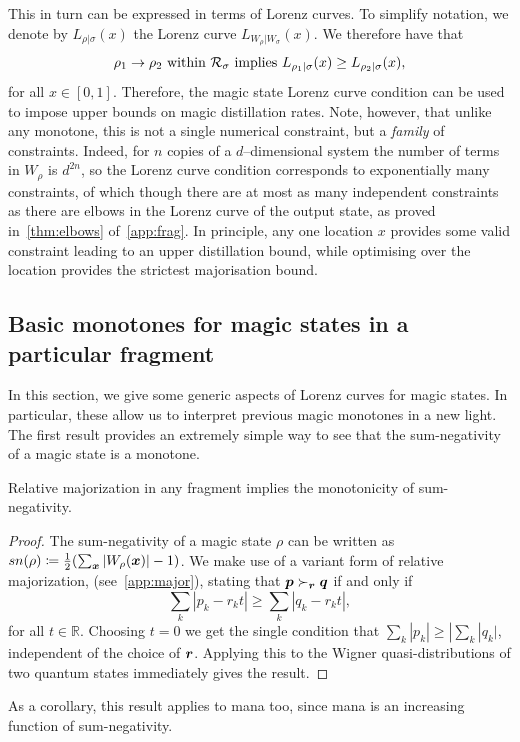 \documentclass[pra,
aps,
twocolumn,
superscriptaddress,
groupedaddress,
nofootinbib,
reprint
]{revtex4-1}
\begin{document}
This in turn can be expressed in terms of Lorenz curves. To simplify notation, we denote by $L_{\rho | \sigma}(x)$ the Lorenz curve $L_{W_{\rho} | W_{\sigma}} (x)$. We therefore have that
\begin{equation}
\rho_1 \rightarrow \rho_2 \mbox{ within }{\mathcal R}_\sigma \mbox{ implies } L_{\rho_1 |\sigma} (x) \ge L_{\rho_2 |\sigma} (x),
\end{equation}
for all $x \in [0,1]$. Therefore, the magic state Lorenz curve condition can be used to impose upper bounds on magic distillation rates. Note, however, that unlike any monotone, this is not a single numerical constraint, but a \emph{family} of constraints. Indeed, for $n$ copies of a $d$--dimensional system the number of terms in $W_{\rho}$ is $d^{2n}$, so the Lorenz curve condition corresponds to exponentially many constraints, of which though there are at most as many independent constraints as there are elbows in the Lorenz curve of the output state, as proved in~\cref{thm:elbows} of~\cref{app:frag}.
In principle, any one location $x$ provides some valid constraint leading to an upper distillation bound, while optimising over the location provides the strictest majorisation bound.

\subsection{Basic monotones for magic states in a particular fragment}
\label{sec:monotones_frag}

In this section, we give some generic aspects of Lorenz curves for magic states. In particular, these allow us to interpret previous magic monotones in a new light. The first result provides an extremely simple way to see that the sum-negativity of a magic state is a monotone.

\begin{lemma} Relative majorization in any fragment implies the monotonicity of sum-negativity. 
\end{lemma}
\begin{proof}
	The sum-negativity of a magic state $\rho$ can be written as $sn(\rho) \coloneqq \frac{1}{2} (\sum_{\boldsymbol{x}} |W_\rho(\boldsymbol{x}) | - 1)$.
We make use of a variant form of relative majorization, (see~\cref{app:major}), stating that $\boldsymbol{p} \succ_{\boldsymbol{r}} \boldsymbol{q}$ if and only if
	\begin{equation}
\sum_k | p_k - r_k t | \geq \sum_k | q_k - r_k t |,
\end{equation}
for all $t\in \mathbb{R}$. Choosing $t=0$ we get the single condition that $\sum_k |p_k| \ge |\sum_k |q_k|$, independent of the choice of $\boldsymbol{r}$. Applying this to the Wigner quasi-distributions of two quantum states immediately gives the result.
\end{proof}
As a corollary, this result applies to mana too, since mana is an increasing function of sum-negativity.
\end{document}
